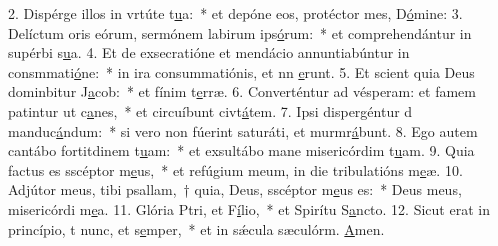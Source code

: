 2. Dispérge illos in vrtúte t\uline{u}a:~* et depóne eos, protéctor mes, D\uline{ó}mine:
3. Delíctum oris eórum, sermónem labirum ips\uline{ó}rum:~* et comprehendántur in supérbi s\uline{u}a.
4. Et de exsecratióne et mendácio annuntiabúntur in consmmati\uline{ó}ne:~* in ira consummatiónis, et nn \uline{e}runt.
5. Et scient quia Deus dominbitur J\uline{a}cob:~* et fínim t\uline{e}rræ.
6. Converténtur ad vésperam: et famem patintur ut c\uline{a}nes,~* et circuíbunt civt\uline{á}tem.
7. Ipsi dispergéntur d manduc\uline{á}ndum:~* si vero non fúerint saturáti, et murmr\uline{á}bunt.
8. Ego autem cantábo fortitdinem t\uline{u}am:~* et exsultábo mane misericórdim t\uline{u}am.
9. Quia factus es sscéptor m\uline{e}us,~* et refúgium meum, in die tribulatións m\uline{e}æ.
10. Adjútor meus, tibi psallam,~† quia, Deus, sscéptor m\uline{e}us es:~* Deus meus, misericórdi m\uline{e}a.
11. Glória Ptri, et F\uline{í}lio,~* et Spirítu S\uline{a}ncto.
12. Sicut erat in princípio, t nunc, et s\uline{e}mper,~* et in sǽcula sæculórm. \uline{A}men.
